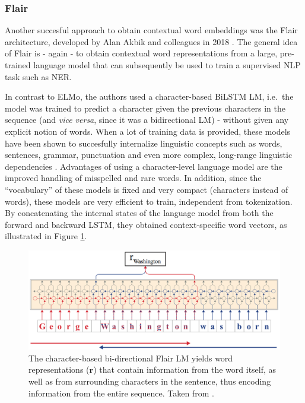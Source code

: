 \documentclass[12pt,a4paper,]{book}
\begin{document}
\hypertarget{flair}{%
\subsubsection{Flair}\label{flair}}

Another succesful approach to obtain contextual word embeddings was the Flair architecture, developed by Alan Akbik and colleagues in 2018 \citep{akbik2018}. The general idea of Flair is - again - to obtain contextual word representations from a large, pre-trained language model that can subsequently be used to train a supervised NLP task such as NER.

In contrast to ELMo, the authors used a character-based BiLSTM LM, i.e.~the model was trained to predict a character given the previous characters in the sequence (and \emph{vice versa}, since it was a bidirectional LM) - without given any explicit notion of words. When a lot of training data is provided, these models have been shown to succesfully internalize linguistic concepts such as words, sentences, grammar, punctuation and even more complex, long-range linguistic dependencies \citep{graves2014, sutskever2014}. Advantages of using a character-level language model are the improved handling of misspelled and rare words. In addition, since the ``vocabulary'' of these models is fixed and very compact (characters instead of words), these models are very efficient to train, independent from tokenization. By concatenating the internal states of the language model from both the forward and backward LSTM, they obtained context-specific word vectors, as illustrated in Figure \ref{fig:flairLM}.

\begin{figure}

{\centering \includegraphics[width=1\linewidth]{images/flair_LM} 

}

\caption{The character-based bi-directional Flair LM yields word representations (\(\mathbf{r}\)) that contain information from the word itself, as well as from surrounding characters in the sentence, thus encoding information from the entire sequence. Taken from \citep{akbik2018}.}\label{fig:flairLM}
\end{figure}
\end{document}
